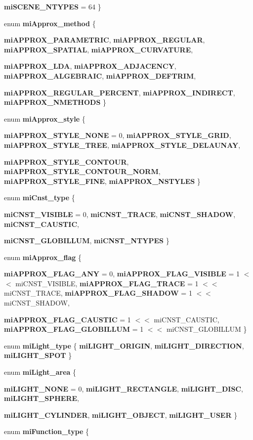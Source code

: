 \begin{CompactItemize}
{\bf mi\-SCENE\_\-NTYPES} =  64
 \}
\item 
enum {\bf mi\-Approx\_\-method} \{ \par
{\bf mi\-APPROX\_\-PARAMETRIC}, 
{\bf mi\-APPROX\_\-REGULAR}, 
{\bf mi\-APPROX\_\-SPATIAL}, 
{\bf mi\-APPROX\_\-CURVATURE}, 
\par
{\bf mi\-APPROX\_\-LDA}, 
{\bf mi\-APPROX\_\-ADJACENCY}, 
{\bf mi\-APPROX\_\-ALGEBRAIC}, 
{\bf mi\-APPROX\_\-DEFTRIM}, 
\par
{\bf mi\-APPROX\_\-REGULAR\_\-PERCENT}, 
{\bf mi\-APPROX\_\-INDIRECT}, 
{\bf mi\-APPROX\_\-NMETHODS}
 \}
\item 
enum {\bf mi\-Approx\_\-style} \{ \par
{\bf mi\-APPROX\_\-STYLE\_\-NONE} =  0, 
{\bf mi\-APPROX\_\-STYLE\_\-GRID}, 
{\bf mi\-APPROX\_\-STYLE\_\-TREE}, 
{\bf mi\-APPROX\_\-STYLE\_\-DELAUNAY}, 
\par
{\bf mi\-APPROX\_\-STYLE\_\-CONTOUR}, 
{\bf mi\-APPROX\_\-STYLE\_\-CONTOUR\_\-NORM}, 
{\bf mi\-APPROX\_\-STYLE\_\-FINE}, 
{\bf mi\-APPROX\_\-NSTYLES}
 \}
\item 
enum {\bf mi\-Cnst\_\-type} \{ \par
{\bf mi\-CNST\_\-VISIBLE} =  0, 
{\bf mi\-CNST\_\-TRACE}, 
{\bf mi\-CNST\_\-SHADOW}, 
{\bf mi\-CNST\_\-CAUSTIC}, 
\par
{\bf mi\-CNST\_\-GLOBILLUM}, 
{\bf mi\-CNST\_\-NTYPES}
 \}
\item 
enum {\bf mi\-Approx\_\-flag} \{ \par
{\bf mi\-APPROX\_\-FLAG\_\-ANY} =  0, 
{\bf mi\-APPROX\_\-FLAG\_\-VISIBLE} =  1 $<$$<$ mi\-CNST\_\-VISIBLE, 
{\bf mi\-APPROX\_\-FLAG\_\-TRACE} =  1 $<$$<$ mi\-CNST\_\-TRACE, 
{\bf mi\-APPROX\_\-FLAG\_\-SHADOW} =  1 $<$$<$ mi\-CNST\_\-SHADOW, 
\par
{\bf mi\-APPROX\_\-FLAG\_\-CAUSTIC} =  1 $<$$<$ mi\-CNST\_\-CAUSTIC, 
{\bf mi\-APPROX\_\-FLAG\_\-GLOBILLUM} =  1 $<$$<$ mi\-CNST\_\-GLOBILLUM
 \}
\item 
enum {\bf mi\-Light\_\-type} \{ {\bf mi\-LIGHT\_\-ORIGIN}, 
{\bf mi\-LIGHT\_\-DIRECTION}, 
{\bf mi\-LIGHT\_\-SPOT}
 \}
\item 
enum {\bf mi\-Light\_\-area} \{ \par
{\bf mi\-LIGHT\_\-NONE} =  0, 
{\bf mi\-LIGHT\_\-RECTANGLE}, 
{\bf mi\-LIGHT\_\-DISC}, 
{\bf mi\-LIGHT\_\-SPHERE}, 
\par
{\bf mi\-LIGHT\_\-CYLINDER}, 
{\bf mi\-LIGHT\_\-OBJECT}, 
{\bf mi\-LIGHT\_\-USER}
 \}
\item 
enum {\bf mi\-Function\_\-type} \{ \par
$$
\end{CompactItemize}
